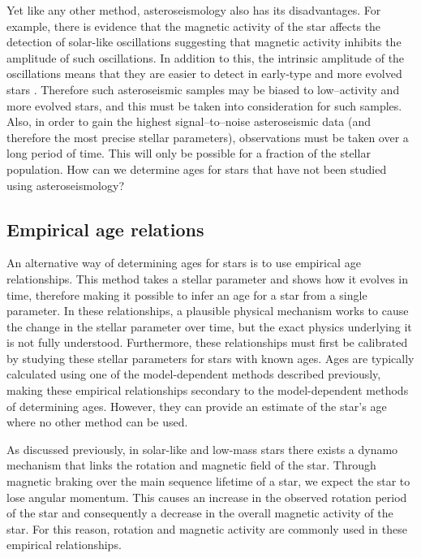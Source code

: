 Yet like any other method, asteroseismology also has its disadvantages. For example, there is evidence that the magnetic activity of the star affects the detection of solar-like oscillations \citep{Chaplin_etal_2011_stellar_activity} suggesting that magnetic activity inhibits the amplitude of such oscillations. In addition to this, the intrinsic amplitude of the oscillations means that they are easier to detect in early-type and more evolved stars \citep{Houdek_etal_1999}. Therefore such asteroseismic samples may be biased to low--activity and more evolved stars, and this must be taken into consideration for such samples. Also, in order to gain the highest signal--to--noise asteroseismic data (and therefore the most precise stellar parameters), observations must be taken over a long period of time. This will only be possible for a fraction of the stellar population. How can we determine ages for stars that have not been studied using asteroseismology?

\subsection{Empirical age relations}
An alternative way of determining ages for stars is to use empirical age relationships. This method takes a stellar parameter and shows how it evolves in time, therefore making it possible to infer an age for a star from a single parameter. In these relationships, a plausible physical mechanism works to cause the change in the stellar parameter over time, but the exact physics underlying it is not fully understood. Furthermore, these relationships must first be calibrated by studying these stellar parameters for stars with known ages. Ages are typically calculated using one of the model-dependent methods described previously, making these empirical relationships secondary to the model-dependent methods of determining ages. However, they can provide an estimate of the star's age where no other method can be used.

As discussed previously, in solar-like and low-mass stars there exists a dynamo mechanism that links the rotation and magnetic field of the star. Through magnetic braking over the main sequence lifetime of a star, we expect the star to lose angular momentum. This causes an increase in the observed rotation period of the star and consequently a decrease in the overall magnetic activity of the star. For this reason, rotation and magnetic activity are commonly used in these empirical relationships.

